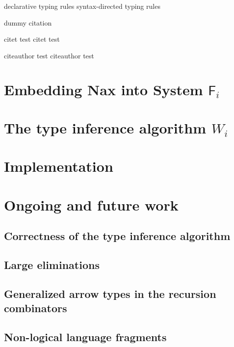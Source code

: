 \documentclass{llncs}
\newcommand{\Wi}{\ensuremath{W_i}}
\newcommand{\Fi}{\ensuremath{\mathsf{F}_i}}
\begin{document}
declarative typing rules
syntax-directed typing rules

\cite{Girard72} dummy citation
\cite{AhnShe11}

\citet{Girard72} citet test
\citet{AhnShe11} citet test

\citeauthor{Girard72} citeauthor test
\citeauthor{AhnShe11} citeauthor test

\section{Embedding Nax into System \Fi}

\section{The type inference algorithm \Wi}

\section{Implementation}

\section{Ongoing and future work}

\subsection{Correctness of the type inference algorithm}

\subsection{Large eliminations}

\subsection{Generalized arrow types in the recursion combinators}

\subsection{Non-logical language fragments}



\end{document}
